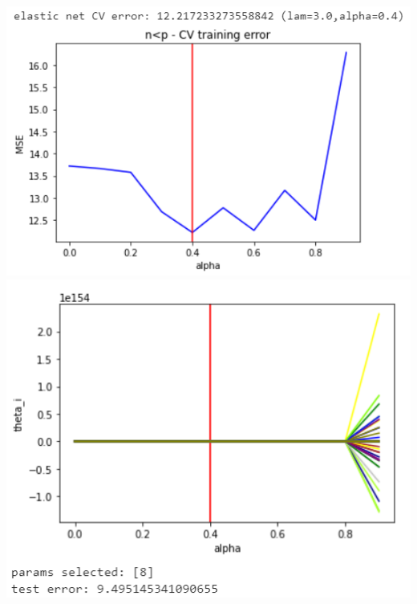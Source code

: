 \documentclass[11pt]{article}
\begin{document}
\begin{center}
\includegraphics[scale=0.7]{charts/en_ortho_n_lt_p_err.PNG}
\includegraphics[scale=0.7]{charts/en_ortho_n_lt_p_thetas.PNG}


\end{center}
\end{document}
